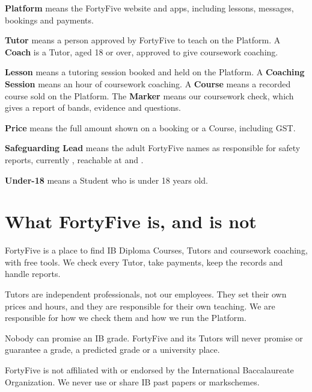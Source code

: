 \documentclass[11pt]{article}
\begin{document}
\begin{clauses}
  \item \textbf{Platform} means the FortyFive website and apps, including lessons, messages, bookings and payments.
  \item \textbf{Tutor} means a person approved by FortyFive to teach on the Platform. A \textbf{Coach} is a Tutor, aged 18 or over, approved to give coursework coaching.
  \item \textbf{Lesson} means a tutoring session booked and held on the Platform. A \textbf{Coaching Session} means an hour of coursework coaching. A \textbf{Course} means a recorded course sold on the Platform. The \textbf{Marker} means our coursework check, which gives a report of bands, evidence and questions.
  \item \textbf{Price} means the full amount shown on a booking or a Course, including GST.
  \item \textbf{Safeguarding Lead} means the adult FortyFive names as responsible for safety reports, currently , reachable at  and .
  \item \textbf{Under-18} means a Student who is under 18 years old.
\end{clauses}

\section{What FortyFive is, and is not}

\begin{clauses}
  \item FortyFive is a place to find IB Diploma Courses, Tutors and coursework coaching, with free tools. We check every Tutor, take payments, keep the records and handle reports.
  \item Tutors are independent professionals, not our employees. They set their own prices and hours, and they are responsible for their own teaching. We are responsible for how we check them and how we run the Platform.
  \item Nobody can promise an IB grade. FortyFive and its Tutors will never promise or guarantee a grade, a predicted grade or a university place.
  \item FortyFive is not affiliated with or endorsed by the International Baccalaureate Organization. We never use or share IB past papers or markschemes.
\end{clauses}
\end{document}
